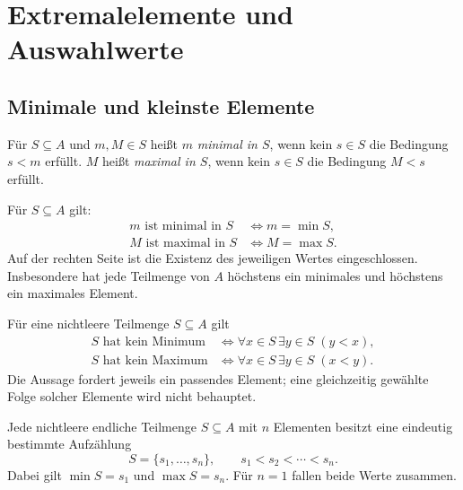 \chapter{Extremalelemente und Auswahlwerte}
\label{b15guide:ch:extrema}

\section{Minimale und kleinste Elemente}

\begin{definition}
Für $S\subseteq A$ und $m,M\in S$ heißt $m$ \emph{minimal
in $S$}, wenn kein $s\in S$ die Bedingung $s<m$ erfüllt.
$M$ heißt \emph{maximal in $S$}, wenn kein $s\in S$
die Bedingung $M<s$ erfüllt.
\end{definition}

\begin{theorem}
\label{b15guide:thm:minimal}
Für $S\subseteq A$ gilt:
\[
\begin{aligned}
 m\text{ ist minimal in }S&\Longleftrightarrow m=\min S,\\
 M\text{ ist maximal in }S&\Longleftrightarrow M=\max S.
\end{aligned}
\]
Auf der rechten Seite ist die Existenz des jeweiligen Wertes
eingeschlossen. Insbesondere hat jede Teilmenge von $A$
höchstens ein minimales und höchstens ein maximales Element.
\end{theorem}

\begin{theorem}
\label{b15guide:thm:no-endpoint}
Für eine nichtleere Teilmenge $S\subseteq A$ gilt
\[
\begin{aligned}
 S\text{ hat kein Minimum}
 &\Longleftrightarrow
   \forall x\in S\,\exists y\in S\;(y<x),\\
 S\text{ hat kein Maximum}
 &\Longleftrightarrow
   \forall x\in S\,\exists y\in S\;(x<y).
\end{aligned}
\]
Die Aussage fordert jeweils ein passendes Element;
eine gleichzeitig gewählte Folge solcher Elemente wird nicht behauptet.
\end{theorem}

\begin{theorem}
\label{b15guide:thm:sorting}
Jede nichtleere endliche Teilmenge $S\subseteq A$ mit $n$ Elementen
besitzt eine eindeutig bestimmte Aufzählung
\[
 S=\{s_1,\ldots,s_n\},\qquad s_1<s_2<\cdots<s_n.
\]
Dabei gilt $\min S=s_1$ und $\max S=s_n$.
Für $n=1$ fallen beide Werte zusammen.
\end{theorem}

